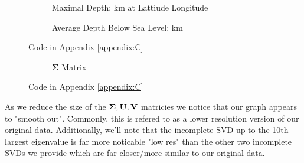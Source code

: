 \documentclass[letterpaper,12pt]{article}
\begin{document}
\begin{figure}[H]
    \begin{adjustwidth}{-1in}{-1in}
    \centering
    \begin{subfigure}[b]{0.60\textwidth}
        \centering
        
        \caption{Maximal Depth: km at Lattiude Longitude}
        \label{fig:6a}
    \end{subfigure}
    \begin{subfigure}[b]{0.60\textwidth}
        \centering
        
        \caption{Average Depth Below Sea Level: km}
        \label{fig:6b}
    \end{subfigure}
    \end{adjustwidth}
    \label{fig:6}
    \caption{Code in Appendix \ref{appendix:C}}
\end{figure}
\begin{figure}[H]
    \begin{adjustwidth}{-1in}{-1in}
    \centering
    \begin{subfigure}[b]{0.65\textwidth}
        \centering
        
        \label{fig:7a}
    \end{subfigure}
    \begin{subfigure}[b]{0.65\textwidth}
        \centering
        
        \caption{\(\mathbf{\Sigma}\) Matrix}
        \label{fig:7b}
    \end{subfigure}
    \end{adjustwidth}
    \label{fig:7}
    \caption{Code in Appendix \ref{appendix:C}}
\end{figure}
As we reduce the size of the \(\vb{\Sigma}, \vb{U}, \vb{V}\) matricies we notice that our graph appears to "smooth out". 
Commonly, this is refered to as a lower resolution version of our original data.
Additionally, we'll note that the incomplete SVD up to the 10th largest eigenvalue is far more noticable "low res" than the other two incomplete SVDs we provide which are far closer/more similar to our original data.
\end{document}
